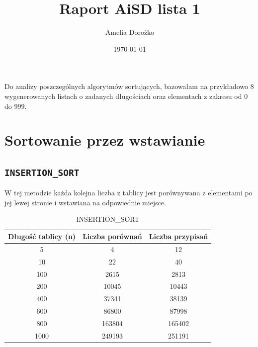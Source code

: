 \documentclass{article}
\title{Raport AiSD lista 1}
\author{Amelia Dorożko}
\date{\today}
\begin{document}
	\maketitle
Do analizy poszczególnych algorytmów sortujących, bazowałam na przykładowo 8 wygenerowanych listach o zadanych długościach oraz elementach z zakresu od $0$ do $999$.
\section{Sortowanie przez wstawianie}
\subsection{\texttt{INSERTION\_SORT}}

W tej metodzie każda kolejna liczba z tablicy jest porównywana z elementami po jej lewej stronie i wstawiana na odpowiednie miejsce.
\begin{table}[h!]
	\centering
	\small
	\begin{tabular}{|c|c|c|}
		\hline
		\small
		\textbf{Długość tablicy (n)} & \textbf{Liczba porównań} & \textbf{Liczba przypisań} \\ \hline
		5   & 4     & 12     \\ \hline
		10  & 22    & 40     \\ \hline
		100 & 2615  & 2813   \\ \hline
		200 & 10045 & 10443  \\ \hline
		400 & 37341 & 38139  \\ \hline
		600 & 86800 & 87998  \\ \hline
		800 & 163804 & 165402 \\ \hline
		1000 & 249193 & 251191 \\ \hline
	\end{tabular}
	\caption{INSERTION\_SORT}
\end{table}
\end{document}
